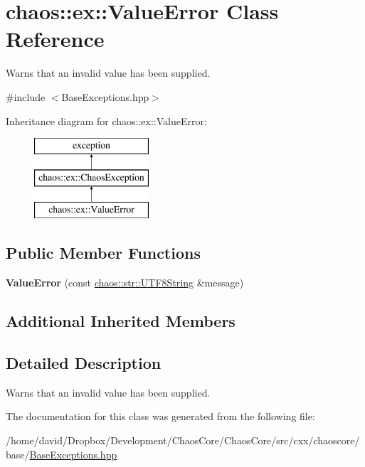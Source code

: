 \hypertarget{classchaos_1_1ex_1_1_value_error}{\section{chaos\-:\-:ex\-:\-:Value\-Error Class Reference}
\label{classchaos_1_1ex_1_1_value_error}
}


Warns that an invalid value has been supplied.  




{\ttfamily \#include $<$Base\-Exceptions.\-hpp$>$}

Inheritance diagram for chaos\-:\-:ex\-:\-:Value\-Error\-:\begin{figure}[H]
\begin{center}
\leavevmode
\includegraphics[height=3.000000cm]{classchaos_1_1ex_1_1_value_error}
\end{center}
\end{figure}
\subsection*{Public Member Functions}
\begin{DoxyCompactItemize}
\item 
\hypertarget{classchaos_1_1ex_1_1_value_error_ad7c90b7ae603eec76908add85d311633}{{\bfseries Value\-Error} (const \hyperlink{classchaos_1_1str_1_1_u_t_f8_string}{chaos\-::str\-::\-U\-T\-F8\-String} \&message)}\label{classchaos_1_1ex_1_1_value_error_ad7c90b7ae603eec76908add85d311633}

\end{DoxyCompactItemize}
\subsection*{Additional Inherited Members}


\subsection{Detailed Description}
Warns that an invalid value has been supplied. 

The documentation for this class was generated from the following file\-:\begin{DoxyCompactItemize}
\item 
/home/david/\-Dropbox/\-Development/\-Chaos\-Core/\-Chaos\-Core/src/cxx/chaoscore/base/\hyperlink{_base_exceptions_8hpp}{Base\-Exceptions.\-hpp}\end{DoxyCompactItemize}
